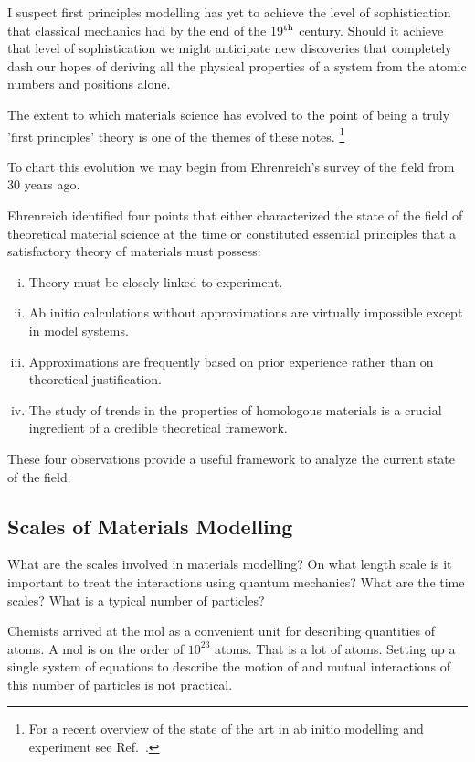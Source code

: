 I suspect first principles modelling has yet to 
achieve the level of sophistication
that classical mechanics had by the end 
of the 19$^{\rm th}$ century. Should it  
achieve that level of sophistication we might anticipate 
new discoveries that completely dash 
our hopes of deriving all the physical properties of a system
from the atomic numbers and positions alone.

The extent to which materials science has evolved to the point of being 
a truly 'first principles' theory is one of the themes of these notes. 
\footnote{For a recent overview of the state of the art in ab initio modelling 
and experiment see Ref.~\cite{ismailbeigi2017}.}
%
%

To chart this evolution we may begin from Ehrenreich's survey of the field from 30 years ago.

Ehrenreich identified four points that either characterized the state 
of the field of theoretical material science at the time or constituted essential principles 
that a satisfactory theory of materials must possess:
%
\begin{enumerate}[i)]
\item Theory must be closely linked to experiment.
\item Ab initio calculations without approximations are virtually impossible 
      except in model systems.
\item Approximations are frequently based on prior experience rather 
      than on theoretical justification.
\item The study of trends in the properties of homologous materials 
      is a crucial ingredient of a credible theoretical framework.
\end{enumerate}
%
These four observations provide a useful framework to analyze the current state of the field.

\subsection{Scales of Materials Modelling}
What are the scales involved in materials modelling?
On what length scale is it important to treat the interactions
using quantum mechanics? What are the time scales? 
What is a typical number of particles?

Chemists arrived at the mol as a convenient unit for describing
quantities of atoms. A mol is on the order of $10^{23}$ atoms. 
That is a lot of atoms. Setting up a single system of 
equations to describe the motion of and mutual 
interactions of this number of particles is not practical.

